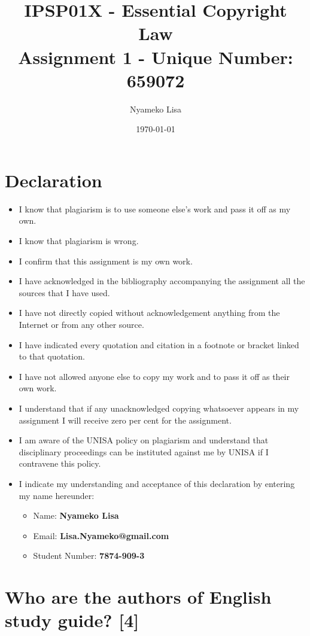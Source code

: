 \documentclass[11pt]{article}
\author{Nyameko Lisa}
\date{\today}
\title{IPSP01X - Essential Copyright Law\\\medskip
\large Assignment 1 - Unique Number: 659072}
\begin{document}
\maketitle
\section*{Declaration}
\label{sec:org25c6e37}
\begin{itemize}
\item I know that plagiarism is to use someone else’s work and pass it off as my own.
\item I know that plagiarism is wrong.
\item I confirm that this assignment is my own work.
\item I have acknowledged in the bibliography accompanying the assignment all the sources that I have used.
\item I have not directly copied without acknowledgement anything from the Internet or from any other source.
\item I have indicated every quotation and citation in a footnote or bracket linked to that quotation.
\item I have not allowed anyone else to copy my work and to pass it off as their own work.
\item I understand that if any unacknowledged copying whatsoever appears in my assignment I will receive zero per cent for the assignment.
\item I am aware of the UNISA policy on plagiarism and understand that disciplinary proceedings can be instituted against me by UNISA if I contravene this policy.
\item I indicate my understanding and acceptance of this declaration by
entering my name hereunder:
\begin{itemize}
\item Name: \textbf{Nyameko Lisa}
\item Email: \textbf{Lisa.Nyameko@gmail.com}
\item Student Number: \textbf{7874-909-3}
\end{itemize}
\end{itemize}
\section{Who are the authors of English study guide? \textbf{[4]}}
\label{sec:orgbe96b55}
\cite{corbett95_waylite_v_fnb} 

\cite{mccreath91_juta_v_dekoker}
\end{document}
